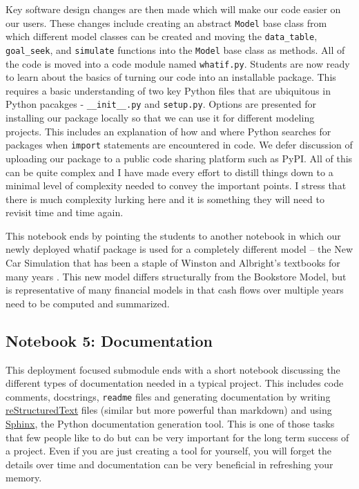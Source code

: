 \documentclass[ited,blindrev]{informs3}              %
\newcommand{\code}[1]{\texttt{#1}}
\begin{document}
Key software design changes are then made which will make our code easier on our users. These changes include creating an abstract \code{Model} base class from which different model classes can be created and moving the \code{data\_table}, \code{goal\_seek}, and \code{simulate} functions into the \code{Model} base class as methods. All of the code is moved into a code module named \code{whatif.py}. Students are now ready to learn about the basics of turning our code into an installable package. This requires a basic understanding of two key Python files that are ubiquitous in Python pacakges - \code{\_\_init\_\_.py} and \code{setup.py}. Options are presented for installing our package locally so that we can use it for different modeling projects. This includes an explanation of how and where Python searches for packages when \code{import} statements are encountered in code. We defer discussion of uploading our package to a public code sharing platform such as PyPI. All of this can be quite complex and I have made every effort to distill things down to a minimal level of complexity needed to convey the important points. I stress that there is much complexity lurking here and it is something they will need to revisit time and time again.

This notebook ends by pointing the students to another notebook in which our newly deployed whatif package is used for a completely different model -- the New Car Simulation that has been a staple of Winston and Albright's textbooks for many years \cite{winstonPracticalManagementScience2018,albrightBusinessAnalyticsData2016}. This new model differs structurally from the Bookstore Model, but is representative of many financial models in that cash flows over multiple years need to be computed and summarized. 

\subsection{Notebook 5: Documentation}

This deployment focused submodule ends with a short notebook discussing the different types of documentation needed in a typical project. This includes code comments, docstrings, \code{readme} files and generating documentation by writing \href{https://www.sphinx-doc.org/en/master/usage/restructuredtext/basics.html}{reStructuredText} files (similar but more powerful than markdown) and using \href{https://www.sphinx-doc.org/en/master/index.html}{Sphinx}, the Python documentation generation tool. This is one of those tasks that few people like to do but can be very important for the long term success of a project. Even if you are just creating a tool for yourself, you will forget the details over time and documentation can be very beneficial in refreshing your memory. 
\end{document}
